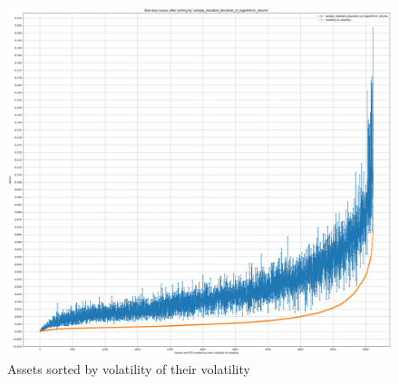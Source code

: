 \documentclass[a4paper,12pt]{report}
\begin{document}
\begin{figure}[htbp]
  \centering
  \includegraphics[width=\textwidth]{images/vol_of_vol.png}
  \caption{Assets sorted by volatility of their volatility}
  \label{fig:fullwidth}
\end{figure}
	
\end{document}
